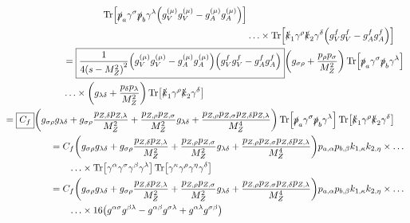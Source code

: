 \documentclass[12 pt,draft]{article}
\renewcommand{\b}[1]{\overline{#1}}
\begin{document}
\begin{problem}[ $\mu\b{\mu}\rightarrow f\b{f}$]
\begin{align}
\begin{split}
				\Tr[
					\slsh{p}_a\gamma^\sigma\slsh{p}_b\gamma^\lambda
					\qty(g_V^{(\mu)}g_V^{(\mu)}-g_A^{(\mu)}g_A^{(\mu)})
					]
				\\&\ldots\times
				\Tr[\slsh{k}_1\gamma^\rho
				\slsh{k}_2\gamma^\delta
				\qty(g_V^fg_V^f-g_A^fg_A^f)
					]
			\end{split}
			\\
			\begin{split}
				&=\boxed{\oo{4\qty(s-M_Z^2)^2}
				\qty(g_V^{(\mu)}g_V^{(\mu)}-g_A^{(\mu)}g_A^{(\mu)})
				\qty(g_V^fg_V^f-g_A^fg_A^f)}
				\qty(g_{\sigma\rho}+\frac{p_\rho p_\sigma}{M_Z^2})
				\Tr[\slsh{p}_a\gamma^\sigma\slsh{p}_b\gamma^\lambda]
				\\&\ldots\times
				\qty(g_{\lambda\delta}+\frac{p_\delta p_\lambda}{M_Z^2})
				\Tr[\slsh{k}_1\gamma^\rho\slsh{k}_2\gamma^\delta]
			\end{split}
			\\
			\begin{split}
				&=\boxed{C_f}
				\qty(
					g_{\sigma\rho}g_{\lambda\delta}
					+g_{\sigma\rho}\frac{p_{Z,\delta} p_{Z,\lambda}}{M_Z^2}
					+\frac{p_{Z,\rho} p_{Z,\sigma}}{M_Z^2}g_{\lambda\delta}
					+\frac{p_{Z,\rho} p_{Z,\sigma} p_{Z,\delta} p_{Z,\lambda}}{M_Z^4}
					)
				\Tr[\slsh{p}_a\gamma^\sigma\slsh{p}_b\gamma^\lambda]
				\Tr[\slsh{k}_1\gamma^\rho\slsh{k}_2\gamma^\delta]
			\end{split}
			\\
			\begin{split}
				&=C_f
				\qty(
					g_{\sigma\rho}g_{\lambda\delta}
					+g_{\sigma\rho}\frac{p_{Z,\delta} p_{Z,\lambda}}{M_Z^2}
					+\frac{p_{Z,\rho} p_{Z,\sigma}}{M_Z^2}g_{\lambda\delta}
					+\frac{p_{Z,\rho} p_{Z,\sigma} p_{Z,\delta} p_{Z,\lambda}}{M_Z^4}
					)p_{a,\alpha}p_{b,\beta}k_{1,\kappa}k_{2,\eta}
				\times\ldots\\&\qquad\ldots\times
				\Tr[\gamma^\alpha\gamma^\sigma\gamma^\beta\gamma^\lambda]
				\Tr[\gamma^\kappa\gamma^\rho\gamma^\eta\gamma^\delta]
			\end{split}
			\\
			\begin{split}
				&=C_f
				\qty(
					g_{\sigma\rho}g_{\lambda\delta}
					+g_{\sigma\rho}\frac{p_{Z,\delta} p_{Z,\lambda}}{M_Z^2}
					+\frac{p_{Z,\rho} p_{Z,\sigma}}{M_Z^2}g_{\lambda\delta}
					+\frac{p_{Z,\rho} p_{Z,\sigma} p_{Z,\delta} p_{Z,\lambda}}{M_Z^4}
					)p_{a,\alpha}p_{b,\beta}k_{1,\kappa}k_{2,\eta}
				\times\ldots\\&\qquad\ldots\times16
				\qty(g^{\alpha\sigma}g^{\beta\lambda}-g^{\alpha\beta}g^{\sigma\lambda}+g^{\alpha\lambda}g^{\sigma\beta})

\end{split}
\end{align}
\end{problem}
\end{document}
